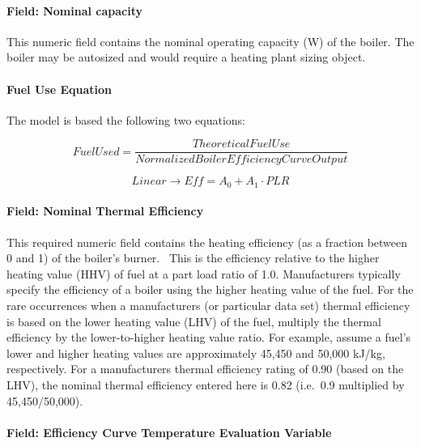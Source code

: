 \paragraph{Field: Nominal capacity}\label{field-nominal-capacity-6}

This numeric field contains the nominal operating capacity (W) of the boiler. The boiler may be autosized and would require a heating plant sizing object.

\paragraph{Fuel Use Equation}\label{fuel-use-equation}

The model is based the following two equations:

\begin{equation}
    FuelUsed = \frac{{TheoreticalFuelUse}}{{NormalizedBoilerEfficiencyCurveOutput}}
\end{equation}

\begin{equation}
    Linear \to Eff = {A_0} + {A_1}\cdot PLR
\end{equation}

\paragraph{Field: Nominal Thermal Efficiency}\label{field-nominal-thermal-efficiency}

This required numeric field contains the heating efficiency (as a fraction between 0 and 1) of the boiler's burner.~ This is the efficiency relative to the higher heating value (HHV) of fuel at a part load ratio of 1.0. Manufacturers typically specify the efficiency of a boiler using the higher heating value of the fuel. For the rare occurrences when a manufacturers (or particular data set) thermal efficiency is based on the lower heating value (LHV) of the fuel, multiply the thermal efficiency by the lower-to-higher heating value ratio. For example, assume a fuel's lower and higher heating values are approximately 45,450 and 50,000 kJ/kg, respectively. For a manufacturers thermal efficiency rating of 0.90 (based on the LHV), the nominal thermal efficiency entered here is 0.82 (i.e.~0.9 multiplied by 45,450/50,000).

\paragraph{Field: Efficiency Curve Temperature Evaluation Variable}\label{field-efficiency-curve-temperature-evaluation-variable}

